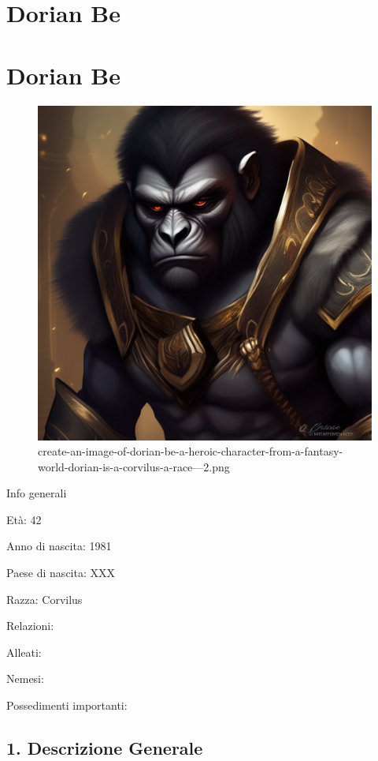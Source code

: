\section{Dorian Be}\label{dorian-be}
\section{Dorian Be}\label{dorian-be-1}


\begin{figure}
\centering
\includegraphics{create-an-image-of-dorian-be-a-heroic-character-from-a-fantasy-world-dorian-is-a-corvilus-a-race---2.png}
\caption{create-an-image-of-dorian-be-a-heroic-character-from-a-fantasy-world-dorian-is-a-corvilus-a-race---2.png}
\end{figure}

Info generali

Età: 42

Anno di nascita: 1981

Paese di nascita: XXX

Razza: Corvilus

Relazioni:

Alleati:

Nemesi:

Possedimenti importanti:


\subsection{1. Descrizione Generale}\label{descrizione-generale}


